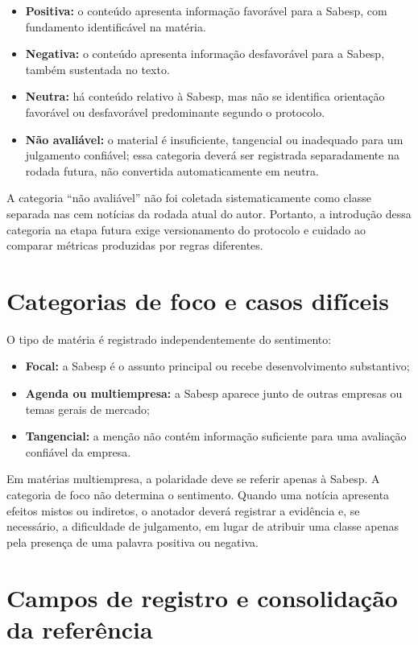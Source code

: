 \begin{itemize}
    \item \textbf{Positiva:} o conteúdo apresenta informação favorável para a Sabesp, com fundamento identificável na matéria.
    \item \textbf{Negativa:} o conteúdo apresenta informação desfavorável para a Sabesp, também sustentada no texto.
    \item \textbf{Neutra:} há conteúdo relativo à Sabesp, mas não se identifica orientação favorável ou desfavorável predominante segundo o protocolo.
    \item \textbf{Não avaliável:} o material é insuficiente, tangencial ou inadequado para um julgamento confiável; essa categoria deverá ser registrada separadamente na rodada futura, não convertida automaticamente em neutra.
\end{itemize}

A categoria ``não avaliável'' não foi coletada sistematicamente como classe separada nas cem notícias da rodada atual do autor. Portanto, a introdução dessa categoria na etapa futura exige versionamento do protocolo e cuidado ao comparar métricas produzidas por regras diferentes.

\section{Categorias de foco e casos difíceis}

O tipo de matéria é registrado independentemente do sentimento:
\begin{itemize}
    \item \textbf{Focal:} a Sabesp é o assunto principal ou recebe desenvolvimento substantivo;
    \item \textbf{Agenda ou multiempresa:} a Sabesp aparece junto de outras empresas ou temas gerais de mercado;
    \item \textbf{Tangencial:} a menção não contém informação suficiente para uma avaliação confiável da empresa.
\end{itemize}

Em matérias multiempresa, a polaridade deve se referir apenas à Sabesp. A categoria de foco não determina o sentimento. Quando uma notícia apresenta efeitos mistos ou indiretos, o anotador deverá registrar a evidência e, se necessário, a dificuldade de julgamento, em lugar de atribuir uma classe apenas pela presença de uma palavra positiva ou negativa.

\section{Campos de registro e consolidação da referência}


